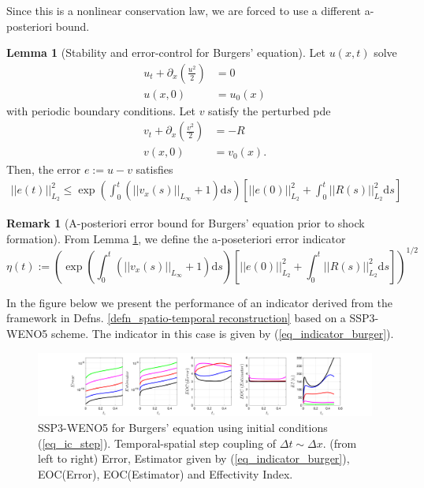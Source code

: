\documentclass[12pt,a4paper]{article}
\numberwithin{equation}{section}
\theoremstyle{definition}
\newcommand{\Norm}[1]{\left|\left|#1\right|\right|}
\newcommand{\qp}[1]{\left(#1\right)}
\newcommand{\qb}[1]{\left[#1\right]}
\newtheorem{Lemma}[subsection]{Lemma}
\newtheorem{Rem}[subsection]{Remark}
\begin{document}
Since this is a nonlinear conservation law, we are forced to use a different a-posteriori bound.
\begin{Lemma}[Stability and error-control for Burgers' equation]\label{Lemma_burger}
Let $u\qp{x,t}$ solve 
\begin{equation}
\begin{aligned}
u_t+\partial_x\qp{\frac{u^2}{2}}&=0\\
u\qp{x,0}&=u_0\qp{x}
\end{aligned}
\end{equation}
with periodic boundary conditions.  Let $v$ satisfy the perturbed pde
\begin{equation}
\begin{aligned}
v_t+\partial_x\qp{\frac{v^2}{2}}&=-R\\
v\qp{x,0}&=v_0\qp{x}.
\end{aligned}
\end{equation}
Then, the error $e:=u-v$ satisfies
\begin{equation}
\begin{aligned}
\Norm{e\qp{t}}^2_{L_2}\leq \exp\qp{\int_0^t\qp{\Norm{v_x\qp{s}}_{L_\infty}+1}\mathrm{d}s}\qb{\Norm{e\qp{0}}_{L_2}^2+\int_0^t\Norm{R\qp{s}}^2_{L_2}\mathrm{d}s}
\end{aligned}
\end{equation}
\end{Lemma}
\begin{Rem}[A-posteriori error bound for Burgers' equation prior to shock formation] From Lemma \ref{Lemma_burger}, we define the a-poseteriori error indicator
\begin{equation}\label{eq_indicator_burger}
\eta\qp{t}:=\qp{\exp\qp{\int_0^t\qp{\Norm{v_x\qp{s}}_{L_\infty}+1}\mathrm{d}s}\qb{\Norm{e\qp{0}}_{L_2}^2+\int_0^t\Norm{R\qp{s}}^2_{L_2}\mathrm{d}s}}^{1/2}
\end{equation}
\end{Rem}
In the figure below we present the performance of an indicator derived from the framework in Defns.  \ref{defn_spatio-temporal reconstruction} based on  a SSP3-WENO5 scheme.  The indicator in this case is given by (\ref{eq_indicator_burger}).
\begin{figure}[H]
	\hspace{-3cm}
	\includegraphics[scale=0.55]{../figures/fig_SSP3WENO_sinIC_plots_1x5_burgers}	
	\caption{SSP3-WENO5 for Burgers' equation using initial conditions (\ref{eq_ic_step}).  Temporal-spatial step coupling of $\Delta t\sim \Delta x$. (from left to right) Error, Estimator given by (\ref{eq_indicator_burger}), EOC(Error), EOC(Estimator) and Effectivity Index.}
	\label{fig_SSP3WENO_sinIC_plots_1x5_burgers}
\end{figure}
\end{document}
